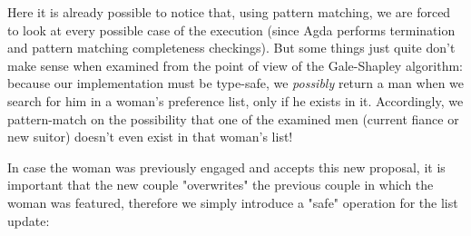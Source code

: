 {Here it is already possible to notice that, using pattern matching, we are forced to look at every possible case of the execution (since Agda performs termination and pattern matching completeness checkings). But some things just quite don't make sense when examined from the point of view of the Gale-Shapley algorithm: because our implementation must be type-safe, we \emph{possibly} return a man when we search for him in a woman's preference list, only if he exists in it. Accordingly, we pattern-match on the possibility that one of the examined men (current fiance or new suitor) doesn't even exist in that woman's list!

In case the woman was previously engaged and accepts this new proposal, it is important that the new couple "overwrites" the previous couple in which the woman was featured, therefore we simply introduce a "safe" operation for the list update:

}
